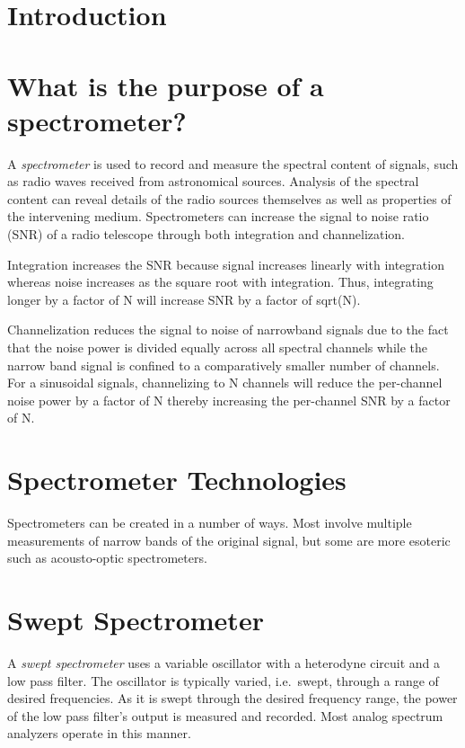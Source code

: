 \documentclass{article}
\begin{document}
\section{Introduction}\label{introduction}

\section{What is the purpose of a
spectrometer?}\label{what-is-the-purpose-of-a-spectrometer}

A \emph{spectrometer} is used to record and measure the spectral content
of signals, such as radio waves received from astronomical sources.
Analysis of the spectral content can reveal details of the radio sources
themselves as well as properties of the intervening medium.
Spectrometers can increase the signal to noise ratio (SNR) of a radio
telescope through both integration and channelization.

Integration increases the SNR because signal increases linearly with
integration whereas noise increases as the square root with integration.
Thus, integrating longer by a factor of N will increase SNR by a factor
of sqrt(N).

Channelization reduces the signal to noise of narrowband signals due to
the fact that the noise power is divided equally across all spectral
channels while the narrow band signal is confined to a comparatively
smaller number of channels. For a sinusoidal signals, channelizing to N
channels will reduce the per-channel noise power by a factor of N
thereby increasing the per-channel SNR by a factor of N.

\section{Spectrometer Technologies}\label{spectrometer-technologies}

Spectrometers can be created in a number of ways. Most involve multiple
measurements of narrow bands of the original signal, but some are more
esoteric such as acousto-optic spectrometers.

\section{Swept Spectrometer}\label{swept-spectrometer}

A \emph{swept spectrometer} uses a variable oscillator with a heterodyne
circuit and a low pass filter. The oscillator is typically varied,
i.e.~swept, through a range of desired frequencies. As it is swept
through the desired frequency range, the power of the low pass filter's
output is measured and recorded. Most analog spectrum analyzers operate
in this manner.
\end{document}
